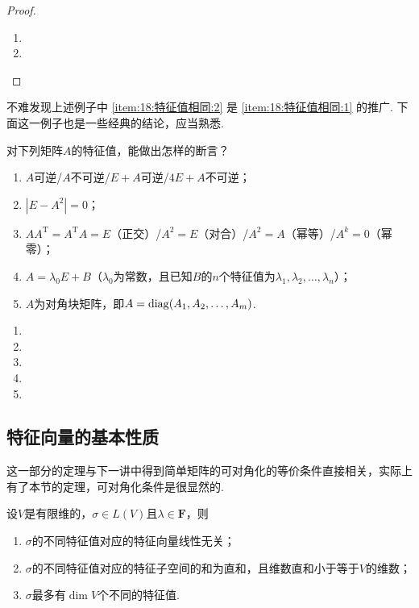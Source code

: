 \begin{proof}
    \begin{enumerate}
        \item

        \item
    \end{enumerate}
\end{proof}

不难发现上述例子中 \ref*{item:18:特征值相同:2} 是 \ref*{item:18:特征值相同:1} 的推广. 下面这一例子也是一些经典的结论，应当熟悉.
\begin{example}
    对下列矩阵$A$的特征值，能做出怎样的断言？
    \begin{enumerate}
        \item $A$可逆/$A$不可逆/$E+A$可逆/$4E+A$不可逆；

        \item $|E-A^2|=0$；

        \item $AA^\mathrm{T}=A^\mathrm{T}A=E$（正交）/$A^2=E$（对合）/$A^2=A$（幂等）/$A^k=0$（幂零）；

        \item $A=\lambda_0E+B$（$\lambda_0$为常数，且已知$B$的$n$个特征值为$\lambda_1,\lambda_2,\ldots,\lambda_n$）；

        \item $A$为对角块矩阵，即$A=\operatorname{diag}(A_1,A_2,\ldots,A_m)$.
    \end{enumerate}
\end{example}

\begin{solution}
    \begin{enumerate}
        \item

        \item

        \item

        \item

        \item
    \end{enumerate}
\end{solution}

\subsection{特征向量的基本性质}

这一部分的定理与下一讲中得到简单矩阵的可对角化的等价条件直接相关，实际上有了本节的定理，可对角化条件是很显然的.
\begin{theorem}
    设$V$是有限维的，$\sigma\in L(V)$且$\lambda\in\mathbf{F}$，则
    \begin{enumerate}
        \item $\sigma$的不同特征值对应的特征向量线性无关；

        \item $\sigma$的不同特征值对应的特征子空间的和为直和，且维数直和小于等于$V$的维数；

        \item $\sigma$最多有$\dim V$个不同的特征值.
    \end{enumerate}
\end{theorem}

